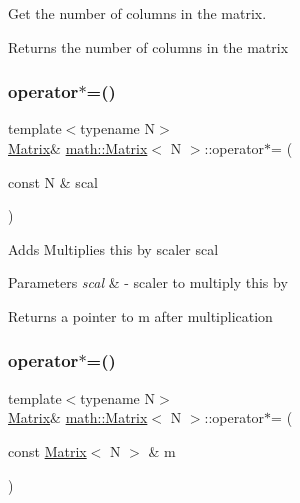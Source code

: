 Get the number of columns in the matrix. \begin{DoxyReturn}{Returns}
the number of columns in the matrix 
\end{DoxyReturn}
\mbox{\label{classmath_1_1Matrix_aa5af962938db227b32efbf3ccb34ddba}} 
\subsubsection{\texorpdfstring{operator$\ast$=()}{operator*=()}\hspace{0.1cm}{\footnotesize\ttfamily [1/2]}}
{\footnotesize\ttfamily template$<$typename N$>$ \\
\hyperlink{classmath_1_1Matrix}{Matrix}\& \hyperlink{classmath_1_1Matrix}{math\+::\+Matrix}$<$ N $>$\+::operator$\ast$= (\begin{DoxyParamCaption}\item[{const N \&}]{scal }\end{DoxyParamCaption})}

Adds Multiplies {\ttfamily this} by scaler {\ttfamily scal} 
\begin{DoxyParams}{Parameters}
{\em scal} & -\/ scaler to multiply {\ttfamily this} by \\
\hline
\end{DoxyParams}
\begin{DoxyReturn}{Returns}
a pointer to {\ttfamily m} after multiplication 
\end{DoxyReturn}
\mbox{\label{classmath_1_1Matrix_ad5bce304ff86d69014b10c3e3a58b8a7}} 
\subsubsection{\texorpdfstring{operator$\ast$=()}{operator*=()}\hspace{0.1cm}{\footnotesize\ttfamily [2/2]}}
{\footnotesize\ttfamily template$<$typename N$>$ \\
\hyperlink{classmath_1_1Matrix}{Matrix}\& \hyperlink{classmath_1_1Matrix}{math\+::\+Matrix}$<$ N $>$\+::operator$\ast$= (\begin{DoxyParamCaption}\item[{const \hyperlink{classmath_1_1Matrix}{Matrix}$<$ N $>$ \&}]{m }\end{DoxyParamCaption})}

